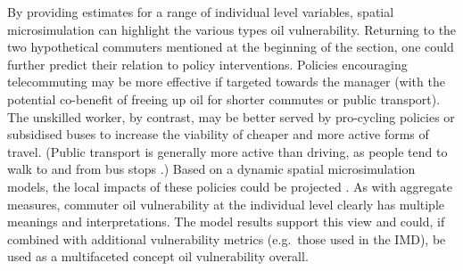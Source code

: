 By providing estimates for a range of individual level variables, spatial
microsimulation can highlight the various types oil vulnerability.
Returning to the two hypothetical commuters mentioned at the beginning of
the section, one could further predict their relation to policy interventions.
Policies encouraging telecommuting
may be more effective if targeted towards the manager (with the potential
co-benefit of freeing up oil for shorter commutes or public transport). The
unskilled worker, by contrast, may be better served by pro-cycling policies
or subsidised buses to
increase the viability of cheaper and more active forms of
travel. (Public transport is generally more active than driving, as people
tend to walk to and from bus stops \citep{Besser2005-active}.)
Based on a dynamic spatial microsimulation models, the local impacts of these
policies could be projected \citep{Ballas2005-ireland}. As with
aggregate measures, commuter oil vulnerability at the individual level clearly
has
multiple meanings and interpretations.
The model results support this view and could, if combined with additional
vulnerability metrics (e.g.~those used in the IMD),
be used as a multifaceted concept oil vulnerability overall.

